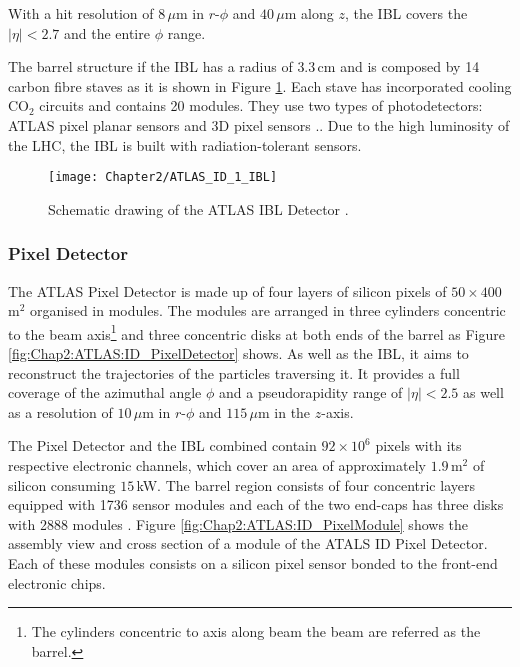 With a hit resolution of $8\,\mu$m in $r$-$\phi$ and $40\,\mu$m along $z$, the IBL covers the $|\eta| < 2.7$ and the entire $\phi$ range.

The barrel structure if the IBL has a radius of $3.3\,$cm and is composed by 14 carbon fibre 
staves as it is shown in Figure \ref{fig:Chap2:ATLAS:ID_IBL}.
Each stave has incorporated cooling CO$_2$ circuits and contains 20 modules.
They use two types of photodetectors: ATLAS pixel planar sensors and 3D pixel sensors \cite{LaRosa:2016nbd}.. 
Due to the high luminosity of the LHC, the IBL is built with radiation-tolerant sensors.

\begin{figure}
	\centering
 	 \texttt{[image: Chapter2/ATLAS\_ID\_1\_IBL]}
	 \caption{Schematic drawing of the ATLAS IBL Detector \cite{Capeans:1291633}. }
	\label{fig:Chap2:ATLAS:ID_IBL}
\end{figure}

\subsubsection{Pixel Detector}
\label{sec:Chap2:ID:Pixel}
The ATLAS Pixel Detector \cite{CERN-LHCC-2017-021} is made up of four layers of silicon pixels 
of $50 \times 400$ \textmu m$^{2}$ organised in modules. The modules are arranged in three cylinders
concentric to the beam axis\footnote{The cylinders concentric to axis along beam the beam are referred as the barrel.} 
and three concentric disks at both ends of the barrel as Figure \ref{fig:Chap2:ATLAS:ID_PixelDetector} shows.
As well as the IBL, it aims to reconstruct the trajectories of the particles traversing it.
It provides a full coverage of the azimuthal angle $\phi$ and a pseudorapidity range of  $|\eta| < 2.5$ as well as
a resolution of $10\,\mu$m in $r$-$\phi$ and $115\,\mu$m in the $z$-axis.

The Pixel Detector and the IBL combined contain $92 \times 10^6$ pixels with its respective electronic channels, which
cover an area of approximately $1.9\,$m$^2$ of silicon consuming $15\,$kW.
The barrel region consists of four concentric layers equipped with 1736 sensor modules and each 
of the two end-caps has three disks with 2888 modules \cite{ATLAS_Web_Detectors}. Figure
\ref{fig:Chap2:ATLAS:ID_PixelModule} shows the assembly view and cross section of a module of the ATALS 
ID Pixel Detector. Each of these modules consists on a silicon pixel sensor bonded to the front-end electronic chips.

